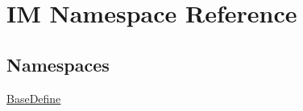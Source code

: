 \hypertarget{namespace_i_m}{}\section{I\+M Namespace Reference}
\label{namespace_i_m}
\subsection*{Namespaces}
\begin{DoxyCompactItemize}
\item 
 \hyperlink{namespace_i_m_1_1_base_define}{Base\+Define}
\end{DoxyCompactItemize}
